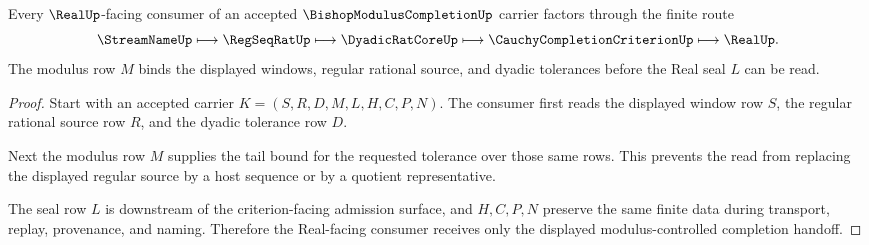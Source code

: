 \begin{theorem}
\label{thm:bishop-modulus-completion-real-seal-route}
Every $\RealUp$-facing consumer of an accepted $\BishopModulusCompletionUp$ carrier factors through the finite route
$$
\StreamNameUp \longmapsto \RegSeqRatUp \longmapsto \DyadicRatCoreUp \longmapsto \CauchyCompletionCriterionUp \longmapsto \RealUp .
$$
The modulus row $M$ binds the displayed windows, regular rational source, and dyadic tolerances before the Real seal $L$ can be read.
\end{theorem}
\begin{proof}
Start with an accepted carrier $K=(S,R,D,M,L,H,C,P,N)$. The consumer first reads the displayed window row $S$, the regular rational source row $R$, and the dyadic tolerance row $D$.

Next the modulus row $M$ supplies the tail bound for the requested tolerance over those same rows. This prevents the read from replacing the displayed regular source by a host sequence or by a quotient representative.

The seal row $L$ is downstream of the criterion-facing admission surface, and $H,C,P,N$ preserve the same finite data during transport, replay, provenance, and naming. Therefore the Real-facing consumer receives only the displayed modulus-controlled completion handoff.
\end{proof}




